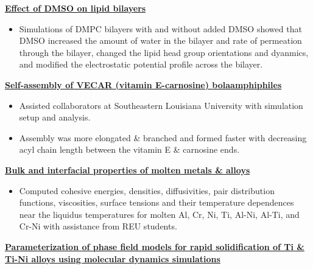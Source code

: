 \begin{cventries}
{\begin{cvitems}
            \item {\textbf{\underline{Effect of DMSO on lipid bilayers}}}
                \vspace{2pt}
                \begin{itemize}
                    \item Simulations of DMPC bilayers with and without added DMSO showed that DMSO increased the amount of water in the bilayer and rate of permeation through the bilayer, changed the lipid head group orientations and dyanmics, and modified the electrostatic potential profile across the bilayer.
                \end{itemize}
            \item {\textbf{\underline{Self-assembly of VECAR (vitamin E-carnosine) bolaamphiphiles}}}
                \vspace{2pt}
                \begin{itemize}
                \item {Assisted collaborators at Southeastern Louisiana University with simulation setup and analysis.}
                \item{Assembly was more elongated \& branched and formed faster with decreasing acyl chain length between the vitamin E \& carnosine ends.}
                \end{itemize}
            \item {\textbf{\underline{Bulk and interfacial properties of molten metals \& alloys}}}
                \vspace{2pt}
                \begin{itemize}
                    \item Computed cohesive energies, densities, diffusivities, pair distribution functions, viscosities, surface tensions and their temperature dependences near the liquidus temperatures for molten Al, Cr, Ni, Ti, Al-Ni, Al-Ti, and Cr-Ni with assistance from REU students.
                \end{itemize}
            \item {\textbf{\underline{Parameterization of phase field models for rapid solidification of Ti \& Ti-Ni alloys using molecular dynamics simulations}}}
                \vspace{2pt}
                \begin{itemize}

\end{itemize}
\end{cvitems}}
\end{cventries}
